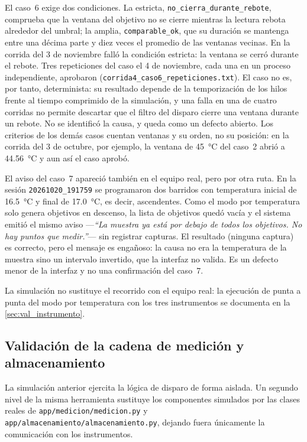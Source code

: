 El caso~6 exige dos condiciones. La estricta,
\texttt{no\_cierra\_durante\_rebote}, comprueba que la ventana del
objetivo no se cierre mientras la lectura rebota alrededor del umbral;
la amplia, \texttt{comparable\_ok}, que su duración se mantenga entre
una décima parte y diez veces el promedio de las ventanas vecinas. En la
corrida del 3 de noviembre falló la condición estricta: la ventana se
cerró durante el rebote. Tres repeticiones del caso el 4 de noviembre,
cada una en un proceso independiente, aprobaron
(\texttt{corrida4\_caso6\_repeticiones.txt}). El caso no es, por
tanto, determinista: su resultado depende de la temporización de los
hilos frente al tiempo comprimido de la simulación, y una falla en una
de cuatro corridas no permite descartar que el filtro del disparo cierre
una ventana durante un rebote. No se identificó la causa, y queda como un
defecto abierto. Los criterios de los demás casos cuentan ventanas y su
orden, no su posición: en la corrida del 3 de octubre, por ejemplo, la
ventana de \SI{45}{\celsius} del caso~2 abrió a \SI{44.56}{\celsius}
y aun así el caso aprobó.

El aviso del caso~7 apareció también en el equipo real, pero por otra
ruta. En la sesión \texttt{20261020\_191759} se programaron dos
barridos con temperatura inicial de \SI{16.5}{\celsius} y final de
\SI{17.0}{\celsius}, es decir, ascendentes. Como el modo por
temperatura solo genera objetivos en descenso, la lista de objetivos
quedó vacía y el sistema emitió el mismo aviso ---\emph{``La muestra ya
está por debajo de todos los objetivos. No hay puntos que medir.''}---
sin registrar capturas. El resultado (ninguna captura) es correcto,
pero el mensaje es engañoso: la causa no era la temperatura de la
muestra sino un intervalo invertido, que la interfaz no valida. Es un
defecto menor de la interfaz y no una confirmación del caso~7.

La simulación no sustituye el recorrido con el equipo real: la
ejecución de punta a punta del modo por temperatura con los tres
instrumentos se documenta en la \cref{sec:val_instrumento}.

\subsection{Validación de la cadena de medición y almacenamiento}
\label{sec:val_cadena}

La simulación anterior ejercita la lógica de disparo de forma aislada.
Un segundo nivel de la misma herramienta sustituye los componentes
simulados por las clases reales de \texttt{app/medicion/medicion.py} y
\texttt{app/almacenamiento/almacenamiento.py}, dejando fuera únicamente
la comunicación con los instrumentos.

